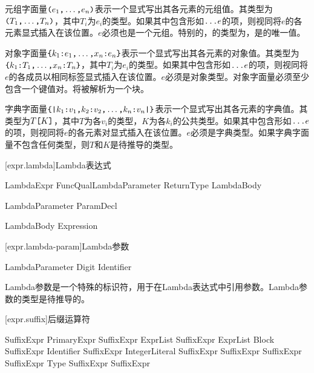 \pnum
元组字面量$\texttt{(}e_1\texttt{,}\ldots\texttt{,}e_n\texttt{)}$表示一个显式写出其各元素的元组值。其类型为$\texttt{(}T_1\texttt{,}\ldots\texttt{,}T_n\texttt{)}$，其中$T_i$为$e_i$的类型。如果其中包含形如$\texttt{...}e$的项，则视同将$e$的各元素显式插入在该位置。$e$必须也是一个元组。特别的，\tcode{()}的类型为，是的唯一值。

\pnum
对象字面量$\texttt{\{}k_1\texttt{:}e_1\texttt{,}\ldots\texttt{,}x_n\texttt{:}e_n\texttt{\}}$表示一个显式写出其各元素的对象值。其类型为$\texttt{\{}k_1\texttt{:}T_1\texttt{,}\ldots\texttt{,}x_n\texttt{:}T_n\texttt{\}}$，其中$T_i$为$e_i$的类型。如果其中包含形如$\texttt{...}e$的项，则视同将$e$的各成员以相同标签显式插入在该位置。$e$必须是对象类型。\enternote 对象字面量必须至少包含一个键值对。\tcode{\{\}}将被解析为一个块。 \exitnote

\pnum
字典字面量$\texttt{\{|}k_1\texttt{:} v_1\texttt{,} k_2\texttt{:} v_2\texttt{,} \ldots\texttt{,} k_n\texttt{:} v_n\texttt{|\}}$表示一个显式写出其各元素的字典值。其类型为$T\texttt{[}K\texttt{]}$，其中$T$为各$v_i$的类型，$K$为各$k_i$的公共类型。如果其中包含形如$\texttt{...}e$的项，则视同将$e$的各元素对显式插入在该位置。$e$必须是字典类型。如果字典字面量不包含任何类型，则$T$和$K$是待推导的类型。

[expr.lambda]{Lambda表达式}

\begin{bnf}{LambdaExpr}
    FuncQual\bnfs LambdaParameter ReturnType\bnfs \terminal{=>} LambdaBody
\end{bnf}

\begin{bnf}{LambdaParameter}
    ParamDecl
\end{bnf}

\begin{bnf}{LambdaBody}
    Expression
\end{bnf}

[expr.lambda-param]{Lambda参数}

\begin{bnf}{LambdaParameter}
    \terminal{\$} Digit\bnfp \br
    \terminal{\$} Identifier
\end{bnf}

\pnum
Lambda参数是一个特殊的标识符，用于在Lambda表达式中引用参数。Lambda参数的类型是待推导的。

[expr.suffix]{后缀运算符}

\begin{bnf}{SuffixExpr}
    PrimaryExpr \br
    SuffixExpr \terminal{[} ExprList\bnfq \terminal{]} \br
    SuffixExpr \terminal{(} ExprList\bnfq \terminal{)} Block\bnfs \br
    SuffixExpr  Identifier \br
    SuffixExpr  IntegerLiteral \br
    SuffixExpr   \br
    SuffixExpr   \br
    SuffixExpr   \br
    SuffixExpr  Type \br
    SuffixExpr  \br
    SuffixExpr 
\end{bnf}


